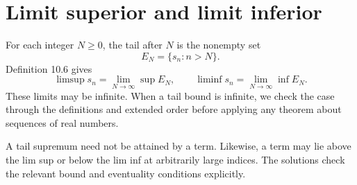 \section{Limit superior and limit inferior}
\label{sec:limsup-liminf}
For each integer $N\ge0$, the tail after $N$ is the nonempty set
\[
 E_N=\{s_n:n>N\}.
\]
Definition 10.6 gives
\[
 \limsup s_n=\lim_{N\to\infty}\sup E_N,\qquad
 \liminf s_n=\lim_{N\to\infty}\inf E_N.
\]
These limits may be infinite. When a tail bound is infinite, we
check the case through the definitions and extended order before
applying any theorem about sequences of real numbers.

A tail supremum need not be attained by a term. Likewise, a term
may lie above the lim sup or below the lim inf at arbitrarily
large indices. The solutions check the relevant bound and
eventuality conditions explicitly.



